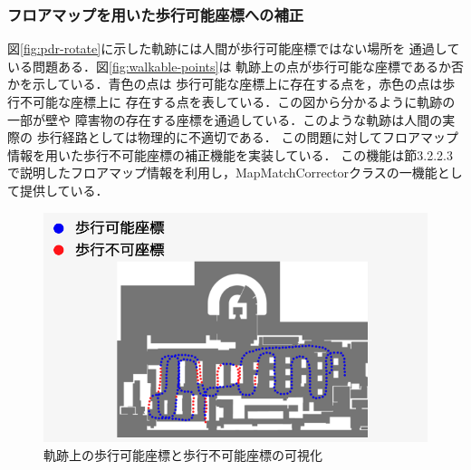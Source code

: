 
\subsubsection{フロアマップを用いた歩行可能座標への補正}

図\ref{fig:pdr-rotate}に示した軌跡には人間が歩行可能座標ではない場所を
通過している問題ある．図\ref{fig:walkable-points}は
軌跡上の点が歩行可能な座標であるか否かを示している．青色の点は
歩行可能な座標上に存在する点を，赤色の点は歩行不可能な座標上に
存在する点を表している．この図から分かるように軌跡の一部が壁や
障害物の存在する座標を通過している．このような軌跡は人間の実際の
歩行経路としては物理的に不適切である．
この問題に対してフロアマップ情報を用いた歩行不可能座標の補正機能を実装している．
この機能は節3.2.2.3で説明したフロアマップ情報を利用し，MapMatchCorrectorクラスの一機能として提供している．




\begin{figure}[H]
    \centering
    \includegraphics[width=\linewidth]{../image/unwalkable_points.jpg}
    \caption{
      軌跡上の歩行可能座標と歩行不可能座標の可視化
    }    \label{fig:unwalkable_points}
\end{figure}


